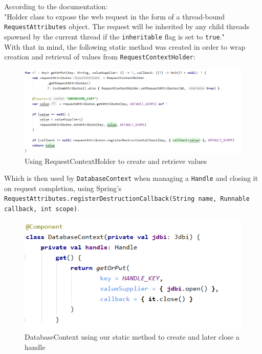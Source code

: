 According to the documentation:\\

"Holder class to expose the web request in the form of a thread-bound \texttt{RequestAttributes}\cite{springRequestAttributes} object.
The request will be inherited by any child threads spawned by the current thread if the \texttt{inheritable} flag is set to \texttt{true}."\\

With that in mind, the following static method was created in order to wrap creation and retrieval of values from \texttt{RequestContextHolder}:\\

\begin{figure}[H]
    \begin{center}
        \includegraphics[scale=0.8]{_figures/Using RequestContextHolder to create and retrieve values.png}
        \caption{Using RequestContextHolder to create and retrieve values}
    \end{center}
\end{figure}

Which is then used by \texttt{DatabaseContext} when managing a \texttt{Handle} and closing it on request completion,
using Spring's \texttt{RequestAttributes.registerDestructionCallback(String name, Runnable callback, int scope)}.\\

\begin{figure}[H]
    \begin{center}
        \includegraphics[scale=0.8]{_figures/DatabaseContext using our static method to create and later close a handle.png}
        \caption{DatabaseContext using our static method to create and later close a handle}
    \end{center}
\end{figure}

